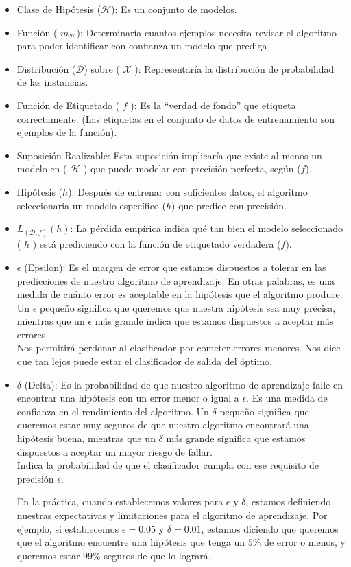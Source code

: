 \begin{itemize}
    \item Clase de Hipótesis ($\mathcal{H}$): Es un conjunto de modelos.
    \item Función ( $m_\mathcal{H}$): Determinaría cuantos ejemplos necesita revisar el algoritmo para poder identificar con confianza un modelo que prediga
    \item Distribución ($\mathcal{D}$) sobre ( $\mathcal{X}$ ): Representaría la distribución de probabilidad de las instancias.
    \item Función de Etiquetado ( $f$ ): Es la “verdad de fondo” que etiqueta correctamente. (Las etiquetas en el conjunto de datos de entrenamiento son ejemplos de la función).
    \item Suposición Realizable: Esta suposición implicaría que existe al menos un modelo en ( $\mathcal{H}$ ) que puede modelar con precisión perfecta, según ($f$).
    \item Hipótesis ($h$): Después de entrenar con suficientes datos, el algoritmo seleccionaría un modelo específico ($h$) que predice con precisión.
    \item $L_{(\mathcal{D},f)}(h)$: La pérdida empírica indica qué tan bien el modelo seleccionado ( $h$ ) está prediciendo con la función de etiquetado verdadera ($f$).
    \item $\epsilon$ (Epsilon): Es el margen de error que estamos dispuestos a tolerar en las predicciones de nuestro algoritmo de aprendizaje. En otras palabras, es una medida de cuánto error es aceptable en la hipótesis que el algoritmo produce. Un $\epsilon$ pequeño significa que queremos que nuestra hipótesis sea muy precisa, mientras que un $\epsilon$ más grande indica que estamos dispuestos a aceptar más errores. \\
	Nos permitirá perdonar al clasificador por cometer errores menores. Nos dice que tan lejos puede estar el clasificador de salida del óptimo.
    \item $\delta$ (Delta): Es la probabilidad de que nuestro algoritmo de aprendizaje falle en encontrar una hipótesis con un error menor o igual a $\epsilon$. Es una medida de confianza en el rendimiento del algoritmo. Un $\delta$ pequeño significa que queremos estar muy seguros de que nuestro algoritmo encontrará una hipótesis buena, mientras que un $\delta$ más grande significa que estamos dispuestos a aceptar un mayor riesgo de fallar.\\
	Indica la probabilidad de que el clasificador cumpla con ese requisito de precisión $\epsilon$.

    En la práctica, cuando establecemos valores para  $\epsilon$  y  $\delta$, estamos definiendo nuestras expectativas y limitaciones para el algoritmo de aprendizaje. Por ejemplo, si establecemos $\epsilon = 0.05$ y $\delta = 0.01$, estamos diciendo que queremos que el algoritmo encuentre una hipótesis que tenga un $5\%$ de error o menos, y queremos estar $99\%$ seguros de que lo logrará.
\end{itemize}

